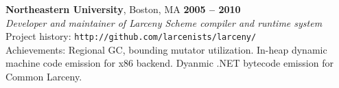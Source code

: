 \documentclass[margin,line,draft]{res}
\def\noneed#1{}
\begin{document}
\begin{resume}
    \textbf{Northeastern University}, Boston, MA \hfill \textbf{2005 -- 2010}\\\vspace{1mm}%
    \textsl{Developer and maintainer of Larceny Scheme compiler and runtime system} \\
    Project history: {\tt http://github.com/larcenists/larceny/}\\
    Achievements: Regional GC, bounding mutator utilization. In-heap dynamic machine code emission for x86 backend. Dyanmic .NET bytecode emission for Common Larceny.
    \vspace{-2mm}
% 
% 
% 
% 
% 


\end{resume}
\end{document}
